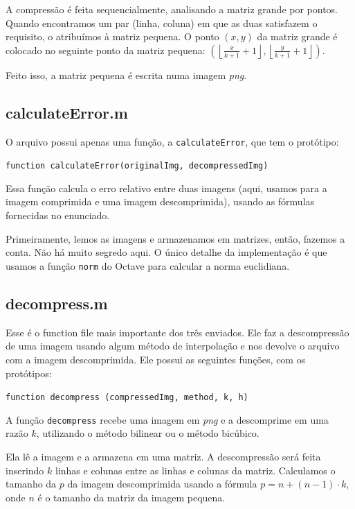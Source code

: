\documentclass[12pt,letterpaper]{article}
\begin{document}
	A compressão é feita sequencialmente, analisando a matriz grande por pontos. Quando encontramos um par (linha, coluna) em que as duas satisfazem o requisito, o atribuímos à matriz pequena. O ponto $(x, y)$ da matriz grande é colocado no seguinte ponto da matriz pequena:  $(\left \lfloor{\frac{x}{k+1}+1}\right \rfloor, \left \lfloor{\frac{y}{k+1}+1}\right \rfloor)$.
	
	Feito isso, a matriz pequena é escrita numa imagem \textit{png}.

	\subsection{calculateError.m}
	
	O arquivo possui apenas uma função, a \texttt{calculateError}, que tem o protótipo:
	
	\begin{center}
		\texttt{function calculateError(originalImg, decompressedImg)}
	\end{center}
	
	Essa função calcula o erro relativo entre duas imagens (aqui, usamos para a imagem comprimida e uma imagem descomprimida), usando as fórmulas fornecidas no enunciado.
	
	\clearpage
	
	Primeiramente, lemos as imagens e armazenamos em matrizes, então, fazemos a conta. Não há muito segredo aqui. O único detalhe da implementação é que usamos a função \texttt{norm} do Octave para calcular a norma euclidiana.
	
	\subsection{decompress.m}
	
	Esse é o function file mais importante dos três enviados. Ele faz a descompressão de uma imagem usando algum método de interpolação e nos devolve o arquivo com a imagem descomprimida. Ele possui as seguintes funções, com os protótipos:
	
	\begin{center}
		\texttt{function decompress (compressedImg, method, k, h)}
	\end{center}
	
	A função \texttt{decompress} recebe uma imagem em \textit{png} e a descomprime em uma razão $k$, utilizando o método bilinear ou o método bicúbico.
	
	Ela lê a imagem e a armazena em uma matriz. A descompressão será feita inserindo $k$ linhas e colunas entre as linhas e colunas da matriz. Calculamos o tamanho da $p$ da imagem descomprimida usando a fórmula $p = n+(n-1)\cdot k$, onde $n$ é o tamanho da matriz da imagem pequena.
	
\end{document}
